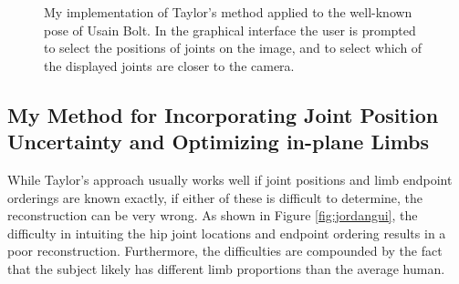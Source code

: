 \documentclass[final]{article}
\begin{document}
\begin{spacing}{1.1}
\begin{figure}[h]
  \caption{My implementation of Taylor's method applied to the well-known pose of Usain Bolt. In the graphical interface the user is prompted to select the positions of joints on the image, and to select which of the displayed joints are closer to the camera.}
  \label{fig:boltgui}
\end{figure}

\subsection{My Method for Incorporating Joint Position Uncertainty and Optimizing in-plane Limbs}

While Taylor's approach usually works well if joint positions and limb endpoint orderings are known exactly, if either of these is difficult to determine, the reconstruction can be very wrong. As shown in Figure \ref{fig:jordangui}, the difficulty in intuiting the hip joint locations and endpoint ordering results in a poor reconstruction. Furthermore, the difficulties are compounded by the fact that the subject likely has different limb proportions than the average human.


\end{spacing}
\end{document}
